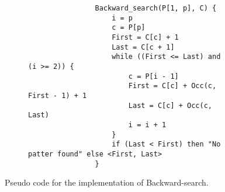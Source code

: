 \documentclass{subfiles}
\begin{document}
    \begin{figure}[!hb]
        \centering
        \begin{subfigure}{0.6\textwidth}
            \centering
            \begin{lstlisting}
                Backward_search(P[1, p], C) {
                    i = p 
                    c = P[p]
                    First = C[c] + 1 
                    Last = C[c + 1]
                    while ((First <= Last) and (i >= 2)) {
                        c = P[i - 1]
                        First = C[c] + Occ(c, First - 1) + 1
                        Last = C[c] + Occ(c, Last)
                        i = i + 1
                    }
                    if (Last < First) then "No patter found" else <First, Last>
                } 
            \end{lstlisting}
        \end{subfigure}
        \caption{Pseudo code for the implementation of Backward-search.}
        \label{Fig:8}
    \end{figure}
\end{document}
